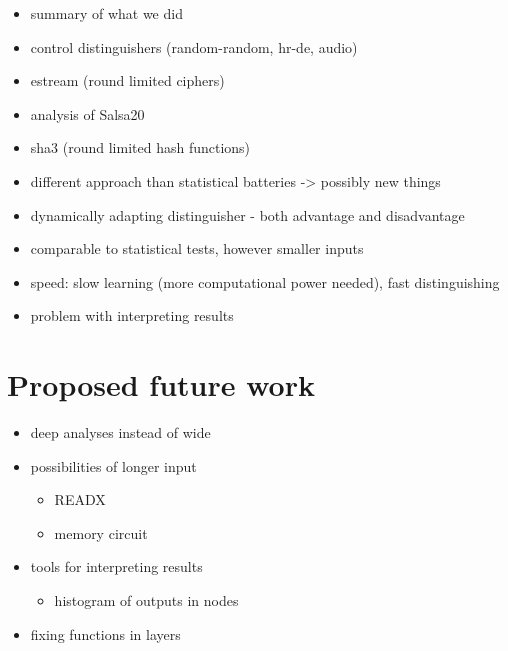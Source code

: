 \documentclass[12pt,oneside]{fithesis2}
\begin{document}
\begin{itemize}
\item summary of what we did
\item control distinguishers (random-random, hr-de, audio)
\item estream (round limited ciphers)
\item analysis of Salsa20
\item sha3 (round limited hash functions)
\end{itemize}

\begin{itemize}
\item different approach than statistical batteries -> possibly new things
\item dynamically adapting distinguisher - both advantage and disadvantage
\item comparable to statistical tests, however smaller inputs
\item speed: slow learning (more computational power needed), fast distinguishing
\item problem with interpreting results
\end{itemize}

\section{Proposed future work}
\label{sec:outro-future-work}

\begin{itemize}
\item deep analyses instead of wide
\item possibilities of longer input 
\begin{itemize}
\item READX
\item memory circuit
\end{itemize}
\item tools for interpreting results
\begin{itemize}
\item histogram of outputs in nodes
\end{itemize}
\item fixing functions in layers
\end{itemize}
\end{document}
